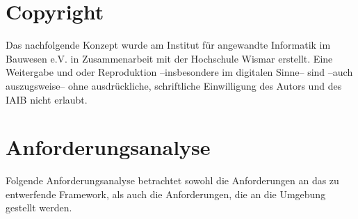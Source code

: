\documentclass{hswpaper}
\begin{document}
\section{Copyright}
Das nachfolgende Konzept wurde am Institut für angewandte Informatik im Bauwesen e.V. in Zusammenarbeit mit der Hochschule Wismar erstellt. Eine Weitergabe und oder Reproduktion --insbesondere im digitalen Sinne-- sind --auch auszugsweise-- ohne ausdrückliche, schriftliche Einwilligung des Autors und des IAIB nicht erlaubt.

\section{Anforderungsanalyse}
Folgende Anforderungsanalyse betrachtet sowohl die Anforderungen an das zu entwerfende Framework, als auch die Anforderungen, die an die Umgebung gestellt werden.
\end{document}
